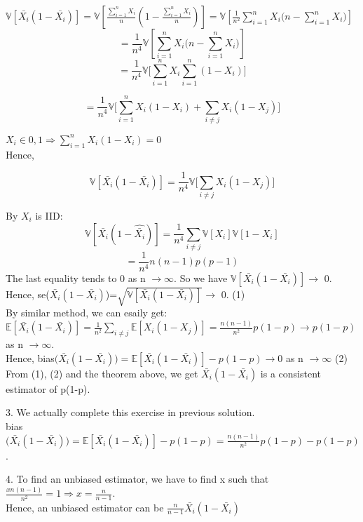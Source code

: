 \documentclass[10pt]{article}
\newenvironment{problem}[2][Problem]{\begin{trivlist}
\item[\hskip \labelsep {\bfseries #1}\hskip \labelsep {\bfseries #2.}]}{\end{trivlist}}
\begin{document}
\begin{problem}{1}
$\mathbb{V}[\bar{X_i}(1-\bar{X_i})]=\mathbb{V}[\frac{\sum_{i=1}^{n} X_i}{n}(1-\frac{\sum_{i=1}^{n} X_i}{n})]=\mathbb{V}[\frac{1}{n^2} \sum_{i=1}^{n} X_i \Big(n-\sum_{i=1}^{n} X_i\Big) ]$ 
\[=\frac{1}{n^4} \mathbb{V}[\sum_{i=1}^{n} X_i \Big(n-\sum_{i=1}^{n} X_i\Big)]\]
\[=\frac{1}{n^4} \mathbb{V}\Big[ \sum_{i=1}^{n} X_i \sum_{i=1}^{n} (1-X_i) \Big]\]

\[=\frac{1}{n^4} \mathbb{V}\Big[\sum_{i=1}^{n} X_i(1-X_i) +\sum_{i \neq j} X_i(1-X_j) \Big] \]

$X_i \in {0,1 } \Rightarrow \sum_{i=1}^{n} X_i(1-X_i)=0$ 
\\
Hence, 

\[\mathbb{V}[\bar{X_i}(1-\bar{X_i})]= \frac{1}{n^4} \mathbb{V} \Big[ \sum_{i \neq j} X_i(1-X_j) \Big] \]

By $X_i$ is IID:
 \[\mathbb{V}[\bar{X_i}(1-\hat{\bar{X_i}})]= \frac{1}{n^4} \sum_{i \neq j} \mathbb{V} [X_i]\mathbb{V}[1-X_i] \]
\[= \frac{1}{n^4} n(n-1)p(p-1) \]
The last equality tends to 0 as n $\rightarrow \infty$. So we have  $\mathbb{V}[\bar{X_i}(1-\bar{X_i})] \rightarrow$ 0. \\
Hence, se($\bar{X_i}(1-\bar{X_i})$)=$\sqrt{\mathbb{V}[\bar{X_i}(1-\bar{X_i})]} \rightarrow$ 0. (1)\\
By similar method, we can esaily get: $\mathbb{E}[\bar{X_i}(1-\bar{X_i})]= \frac{1}{n^2} \sum_{i \neq j} \mathbb{E}[X_i(1-X_j)] = \frac{n(n-1)}{n^2} p(1-p) \rightarrow p(1-p)$ as n $\rightarrow \infty$.\\
Hence, bias$\Big(\bar{X_i}(1-\bar{X_i})\Big)= \mathbb{E}[\bar{X_i}(1-\bar{X_i})] - p(1-p) \rightarrow 0$ as n $\rightarrow \infty$  (2)\\
From (1), (2) and the theorem above, we get $\bar{X_i}(1-\bar{X_i})$ is a consistent estimator of p(1-p).

\item 3. We actually complete this exercise in previous solution.\\
bias$\Big(\bar{X_i}(1-\bar{X_i})\Big)= \mathbb{E}[\bar{X_i}(1-\bar{X_i})] - p(1-p)= \frac{n(n-1)}{n^2} p(1-p) -p(1-p)$.
\item 4. To find an unbiased estimator, we have to find x such that $\frac{xn(n-1)}{n^2}=1 \Rightarrow x=\frac{n}{n-1}$.\\
Hence, an unbiased estimator can be $\frac{n}{n-1}\bar{X_i}(1-\bar{X_i})$





\end{problem}
\end{document}

